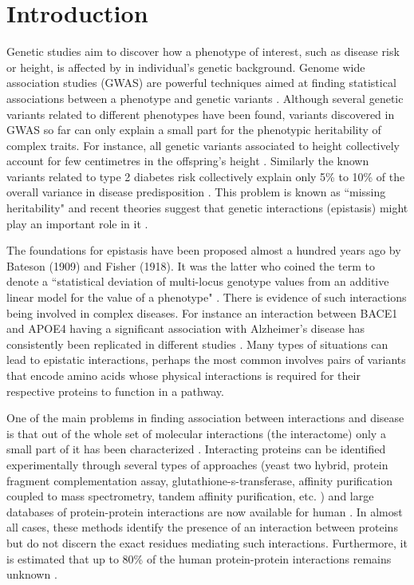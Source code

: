 \section{Introduction}

Genetic studies aim to discover how a phenotype of interest, such as disease risk or height, is affected by in individual's genetic background. 
Genome wide association studies (GWAS) are powerful techniques aimed at finding statistical associations between a phenotype and genetic variants \cite{clarke2011basic}. 
Although several genetic variants related to different phenotypes have been found, variants discovered in GWAS so far can only explain a small part for the phenotypic heritability of complex traits. 
For instance, all genetic variants associated to height collectively account for few centimetres in the offspring's height \cite{wood2014defining}.
Similarly the known variants related to type 2 diabetes risk collectively explain only 5\% to 10\% of the overall variance in disease predisposition \cite{morris2012large, consortium2014genome}. 
This problem is known as ``missing heritability" \cite{manolio2009finding} and recent theories suggest that genetic interactions (epistasis) might play an important role in it \cite{zuk2012mystery, zuk2014searching}.

The foundations for epistasis \cite{gao2010classification} have been proposed almost a hundred years ago by Bateson (1909) and Fisher (1918). 
It was the latter who coined the term to denote a ``statistical deviation of multi-locus genotype values from an additive linear model for the value of a phenotype" \cite{gao2010classification}. 
There is evidence of such interactions being involved in complex diseases. For instance an interaction between BACE1 and APOE4 having a significant association with Alzheimer's disease has consistently been replicated in different studies \cite{combarros2009epistasis}. 
Many types of situations can lead to epistatic interactions, perhaps the most common involves pairs of variants that encode amino acids whose physical interactions is required for their respective proteins to function in a pathway.

One of the main problems in finding association between interactions and disease is that out of the whole set of molecular interactions (the interactome) only a small part of it has been characterized \cite{venkatesan2009empirical}. 
Interacting proteins can be identified experimentally through several types of approaches (yeast two hybrid, protein fragment complementation assay, glutathione-s-transferase, affinity purification coupled to mass spectrometry, tandem affinity purification, etc. \cite{shoemaker2007deciphering}) and large databases of protein-protein interactions are now available for human \cite{stark2006biogrid, shoemaker2007deciphering}. 
In almost all cases, these methods identify the presence of an interaction between proteins but do not discern the exact residues mediating such interactions. Furthermore, it is estimated that up to 80\% of the human protein-protein interactions remains unknown \cite{venkatesan2009empirical}.

